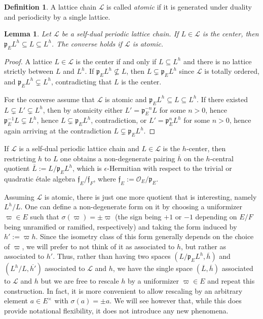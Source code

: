 \documentclass{article}
\def\mf#1{\mathfrak{#1}}
\def\mc#1{\mathcal{#1}}
\def\ol#1{\overline{#1}}
\def\cO{\mathcal{O}}
\newcommand{\fp}{\mathfrak{p}}
\newtheorem{lem}[thm]{Lemma}
\theoremstyle{definition}
\newtheorem{dfn}[thm]{Definition}
\numberwithin{equation}{subsection}
\renewcommand{\-}{\hyp{}}
\newcommand{\rf}{\mathfrak{f}}
\newcommand{\oL}{\overline{L}}
\begin{document}
\begin{dfn}
	A lattice chain $\mc{L}$ is called \emph{atomic} if it is generated under duality and periodicity by a single lattice.
\end{dfn}












\begin{lem} \label{lem:centequiv}
	Let $\mc{L}$ be a self-dual periodic lattice chain. If $L \in \mc{L}$ is the center, then $\mf{p}_EL^h \subseteq L \subseteq L^h$. The converse holds if $\mc{L}$ is atomic.
\end{lem}
\begin{proof}
	A lattice $L \in \mc{L}$ is the center if and only if $L \subseteq L^h$ and there is no lattice strictly between $L$ and $L^h$. If $\mf{p}_EL^h \not\subseteq L$, then $L \subsetneq \mf{p}_EL^h$ since $\mc{L}$ is totally ordered, and $\mf{p}_EL^h \subsetneq L^h$, contradicting that $L$ is the center.

	For the converse assume that $\mc{L}$ is atomic and $\mf{p}_EL^h \subseteq L \subseteq L^h$. If there existed $L \subsetneq L' \subsetneq L^h$, then by atomicity either $L'=\mf{p}_E^{-n}L$ for some $n >0$, hence $\mf{p}_E^{-1}L \subsetneq L^h$, hence $L \subsetneq \mf{p}_EL^h$, contradiction, or $L'=\mf{p}_E^nL^h$ for some $n>0$, hence again arriving at the contradiction $L \subsetneq \mf{p}_EL^h$.
\end{proof}

If $\mc{L}$ is a self-dual periodic lattice chain and $L \in \mc{L}$ is the $h$-center, then  restricting $h$ to $L$ one obtains a non-degenerate pairing $\ol{h}$ on the $h$-central quotient $\oL:=L/\mf{p}_EL^h$, which is $\epsilon$-Hermitian with respect to the trivial or quadratic \'etale algebra $\rf_E/\rf_F$, where $\rf_E:=\cO_E/\fp_E$. 

Assuming $\mc{L}$ is atomic, there is just one more quotient that is interesting, namely $L^h/L$. One can define a non-degenerate form on it by choosing a uniformizer $\varpi \in E$ such that $\sigma(\varpi)=\pm\varpi$ (the sign being $+1$ or $-1$ depending on $E/F$ being unramified or ramified, respectively) and taking the form induced by $h':=\varpi h$. Since the isometry class of this form generally depends on the choice of $\varpi$, we will prefer to not think of it  as associated to $h$, but rather as associated to $h'$. Thus, rather than having two spaces $(L/\mf{p}_EL^h,\ol{h})$ and $(L^h/L,\ol{h'})$ associated to $\mc{L}$ and $h$, we have the single space $(\oL,\ol{h})$ associated to $\mc{L}$ and $h$ but we are free to rescale $h$ by a uniformizer $\varpi \in E$ and repeat this construction. In fact, it is more convenient to allow rescaling by an arbitrary element $a \in E^\times$ with $\sigma(a)=\pm a$. We will see however that, while this does provide notational flexibility, it does not introduce any new phenomena. 
\end{document}
